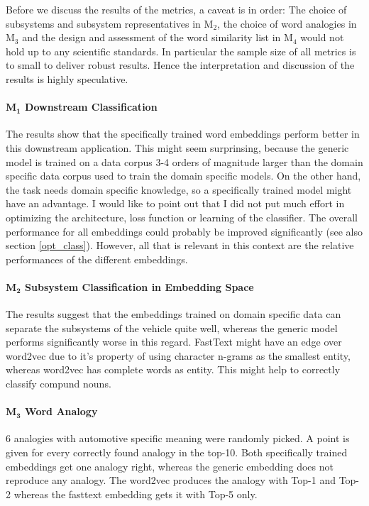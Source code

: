\documentclass[10pt,a4paper]{article}
\begin{document}
Before we discuss the results of the metrics, a caveat is in order: The choice of subsystems and subsystem representatives in M$_2$, the choice of word analogies in M$_3$ and the design and assessment of the word similarity list in  M$_4$ would not hold up to any scientific standards. In particular the sample size of all metrics is to small to deliver robust results. Hence the interpretation and discussion of the results is highly speculative.

\paragraph{$\boldsymbol{M_1}$ Downstream Classification}

The results show that the specifically trained word embeddings perform better in this downstream application. This might seem surprinsing, because the generic model is trained on a data corpus 3-4 orders of magnitude larger than the domain specific data corpus used to train the domain specific models. On the other hand, the task needs domain specific knowledge, so a specifically trained model might have an advantage. 
I would like to point out that I did not put much effort in optimizing the architecture, loss function or learning of the classifier. The overall performance for all embeddings could probably be improved significantly (see also section \ref{opt_class}). However, all that is relevant in this context are the relative performances of the different embeddings.

\paragraph{$\boldsymbol{M_2}$ Subsystem Classification in Embedding Space} The results suggest that the embeddings trained on domain specific data can separate the subsystems of the vehicle quite well, whereas the generic model performs significantly worse in this regard. FastText might have an edge over word2vec due to it's property of using character n-grams as the smallest entity, whereas word2vec has complete words as entity. This might help to correctly classify compund nouns. 

\paragraph{$\boldsymbol{M_3}$ Word Analogy}
6 analogies with automotive specific meaning were randomly picked. A point is given for every correctly found analogy in the top-10. Both specifically trained embeddings get one analogy right, whereas the generic embedding does not reproduce any analogy. The word2vec produces the analogy with Top-1 and Top-2 whereas the fasttext embedding gets it with Top-5 only.
\end{document}
